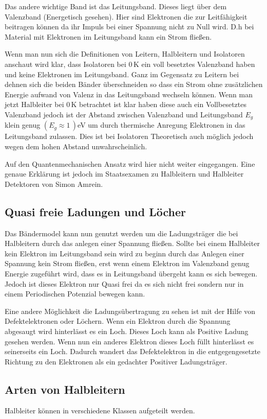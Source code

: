 Das andere wichtige Band ist das Leitungsband. Dieses liegt über dem Valenzband (Energetisch gesehen). Hier sind Elektronen die zur Leitfähigkeit beitragen können da ihr Impuls bei einer Spannung nicht zu Null wird. D.h bei Material mit Elektronen im Leitungsband kann ein Strom fließen.\par
Wenn man nun sich die Definitionen von Leitern, Halbleitern und Isolatoren anschaut wird klar, dass Isolatoren bei $0\,$K ein voll besetztes Valenzband haben und keine Elektronen im Leitungsband. Ganz im Gegensatz zu Leitern bei dehnen sich die beiden Bänder überschneiden so dass ein Strom ohne zusätzlichen Energie aufwand von Valenz in das Leitungsband wechseln können. Wenn man jetzt Halbleiter bei $0$\,K betrachtet ist klar haben diese auch ein Vollbesetztes Valenzband jedoch ist der Abstand zwischen Valenzband und Leitungsband $E_g$ klein genug $(E_g\approx1\,)$eV um durch thermische Anregung Elektronen in das Leitungsband zulassen. Dies ist bei Isolatoren Theoretisch auch möglich jedoch wegen dem hohen Abstand unwahrscheinlich.\par
Auf den Quantenmechanischen Ansatz wird hier nicht weiter eingegangen. Eine genaue Erklärung ist jedoch im Staatsexamen zu Halbleitern und Halbleiter Detektoren von Simon Amrein.  \cite{Staatsexamen}\\
\subsection{Quasi freie Ladungen und Löcher}
Das Bändermodel kann nun genutzt werden um die Ladungsträger die bei Halbleitern durch das anlegen einer Spannung fließen. Sollte bei einem Halbleiter kein Elektron im Leitungsband sein wird zu beginn durch das Anlegen einer Spannung kein Strom fließen, erst wenn einem Elektron im Valenzband genug Energie zugeführt wird, dass es in Leitungsband übergeht kann es sich bewegen. Jedoch ist dieses Elektron nur Quasi frei da es sich nicht frei sondern nur in einem Periodischen Potenzial bewegen kann.\par
Eine andere Möglichkeit die Ladungsübertragung zu sehen ist mit der Hilfe von Defektelektronen oder Löchern. Wenn ein Elektron durch die Spannung abgesaugt wird hinterlässt es ein Loch. Dieses Loch kann als Positive Ladung gesehen werden. Wenn nun ein anderes Elektron dieses Loch füllt hinterlässt es seinerseits ein Loch. Dadurch wandert das Defektelektron in die entgegengesetzte Richtung zu den Elektronen als ein gedachter Positiver Ladungsträger.
\subsection{Arten von Halbleitern}
Halbleiter können in verschiedene Klassen aufgeteilt werden.\par
